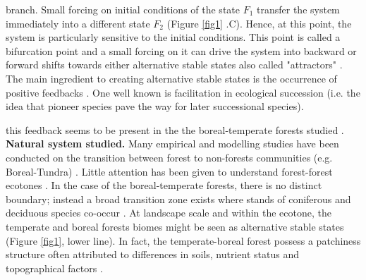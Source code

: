 branch. Small forcing on initial conditions of the state $F_1$ transfer the
system immediately into a different state $F_2$ (Figure \ref{fig1} .C). Hence,
at this point, the system is particularly sensitive to the initial conditions.
This point is called a bifurcation point and a small forcing on it can drive
the system into backward or forward shifts towards either alternative stable
states also called "attractors" \cite{scheffer2009critical}. The main
ingredient to creating alternative stable states is the occurrence of positive
feedbacks \cite{scheffer2009critical,Schroder2005}. One well known is
facilitation in ecological succession (i.e. the idea that pioneer species pave
the way for later successional species). %

 this feedback seems to be present in the the
boreal-temperate forests studied \cite{Barras1998,Society2014}. \\


\textbf{Natural system studied.} Many empirical and modelling studies have
been conducted on the transition between forest to non-forests communities
(e.g. Boreal-Tundra) \cite{Scheffer2012,Scheffer2001,Hirota2011,Messaoud2007}.
Little attention has been given to understand forest-forest ecotones
\cite{Goldblum2010,Graignic2013,Messaoud2007}.  In the case of the boreal-temperate 
forests, there is no distinct boundary; instead a broad transition
zone exists where stands of coniferous and deciduous species co-occur
\cite{Goldblum2010,Fisichelli2013}. At landscape scale and within the ecotone,
the temperate and boreal forests biomes might be seen as  alternative stable
states (Figure \ref{fig1}, lower line).  In fact, the temperate-boreal forest
possess a patchiness structure often attributed to differences in soils,
nutrient status and topographical factors \cite{Society2014}.

